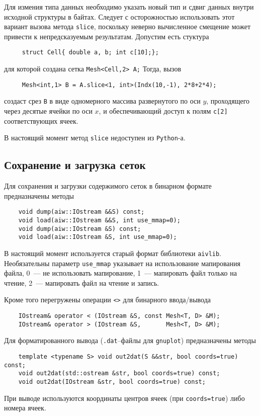 Для измения типа данных необходимо указать новый тип и сдвиг данных внутри исходной структуры в байтах.
Следует с осторожностью использовать этот вариант вызова метода {\tt slice}, поскольку
неверно вычисленное смещение может привести к непредсказуемым результатам. Допустим есть
стуктура 
\begin{verbatim}
     struct Cell{ double a, b; int c[10];}; 
\end{verbatim}
для которой создана сетка \verb'Mesh<Cell,2> A;' Тогда, вызов 
\begin{verbatim}
     Mesh<int,1> B = A.slice<1, int>(Indx(10,-1), 2*8+2*4);
\end{verbatim}
создаст срез {\tt B} в виде одномерного массива развернутого по оси $y$, проходящего
через десятые ячейки по оси $x$, и обеспечивающий доступ к полям {\tt c[2]}
соответствующих ячеек. 

В настоящий момент метод \verb'slice' недоступен из \verb'Python'-а.

\subsection{Сохранение и загрузка сеток}
Для сохранения и загрузки содержимого сеток в бинарном формате предназначены методы
\begin{verbatim}
    void dump(aiw::IOstream &&S) const;
    void load(aiw::IOstream &&S, int use_mmap=0);
    void dump(aiw::IOstream &S) const;
    void load(aiw::IOstream &S, int use_mmap=0);
\end{verbatim}
В настоящий момент используется старый формат библиотеки \verb'aivlib'. Необязательны параметр \verb'use_mmap' 
указывает на использование мапирования файла, 0~--- не использовать мапирование, 1~--- мапировать файл только на чтение,
2~--- мапировать файл на чтение и запись.

Кроме того перегружены операции \verb'<>' для бинарного ввода/вывода
\begin{verbatim}		
    IOstream& operator < (IOstream &S, const Mesh<T, D> &M);
    IOstream& operator > (IOstream &S,       Mesh<T, D> &M);
\end{verbatim}

Для форматированного вывода (\verb'.dat'--файлы для \verb'gnuplot') предназначены методы
\begin{verbatim}		
    template <typename S> void out2dat(S &&str, bool coords=true) const;
    void out2dat(std::ostream &str, bool coords=true) const;
    void out2dat(IOstream &str, bool coords=true) const;
\end{verbatim}
При выводе используются координаты центров ячеек (при \verb'coords=true') либо номера ячеек.

